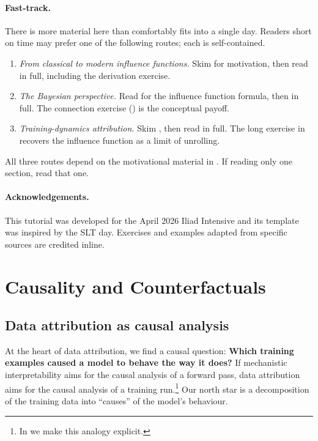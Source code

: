 \documentclass[11pt]{article}
\begin{document}
\paragraph{Fast-track.} There is more material here than comfortably fits into a single day. Readers short on time may prefer one of the following routes; each is self-contained.
\begin{enumerate}[label=\textbf{Route \arabic*.}, leftmargin=*]
  \item \emph{From classical to modern influence functions.} Skim  for motivation, then read  in full, including the derivation exercise.
  \item \emph{The Bayesian perspective.} Read  for the influence function formula, then  in full. The connection exercise () is the conceptual payoff.
  \item \emph{Training-dynamics attribution.} Skim , then read  in full. The long exercise in  recovers the influence function as a limit of unrolling.
\end{enumerate}
All three routes depend on the motivational material in . If reading only one section, read that one.

\paragraph{Acknowledgements.} This tutorial was developed for the April 2026 Iliad Intensive and its template was inspired by the SLT day. 
Exercises and examples adapted from specific sources are credited inline.


\section{Causality and Counterfactuals}\label{sec:causality}

\subsection{Data attribution as causal analysis}\label{subsec:da-causal}

At the heart of data attribution, we find a causal question: \textbf{Which training examples caused a model to behave the way it does?}
If mechanistic interpretability aims for the causal analysis of a forward pass, data attribution aims for the causal analysis of a training run.\footnote{In  we make this analogy explicit.} Our north star is a decomposition of the training data into ``causes'' of the model's behaviour.
\end{document}
